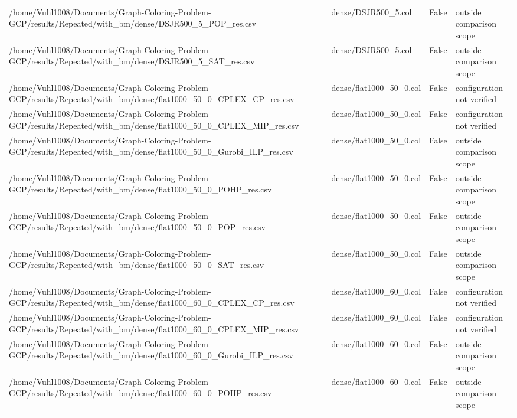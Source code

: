 \begin{table}[htbp]
\begin{tabular}{llll}
/home/Vuhl1008/Documents/Graph-Coloring-Problem-GCP/results/Repeated/with\_bm/dense/DSJR500\_5\_POP\_res.csv & dense/DSJR500\_5.col & False & outside comparison scope \\
/home/Vuhl1008/Documents/Graph-Coloring-Problem-GCP/results/Repeated/with\_bm/dense/DSJR500\_5\_SAT\_res.csv & dense/DSJR500\_5.col & False & outside comparison scope \\
/home/Vuhl1008/Documents/Graph-Coloring-Problem-GCP/results/Repeated/with\_bm/dense/flat1000\_50\_0\_CPLEX\_CP\_res.csv & dense/flat1000\_50\_0.col & False & configuration not verified \\
/home/Vuhl1008/Documents/Graph-Coloring-Problem-GCP/results/Repeated/with\_bm/dense/flat1000\_50\_0\_CPLEX\_MIP\_res.csv & dense/flat1000\_50\_0.col & False & configuration not verified \\
/home/Vuhl1008/Documents/Graph-Coloring-Problem-GCP/results/Repeated/with\_bm/dense/flat1000\_50\_0\_Gurobi\_ILP\_res.csv & dense/flat1000\_50\_0.col & False & outside comparison scope \\
/home/Vuhl1008/Documents/Graph-Coloring-Problem-GCP/results/Repeated/with\_bm/dense/flat1000\_50\_0\_POHP\_res.csv & dense/flat1000\_50\_0.col & False & outside comparison scope \\
/home/Vuhl1008/Documents/Graph-Coloring-Problem-GCP/results/Repeated/with\_bm/dense/flat1000\_50\_0\_POP\_res.csv & dense/flat1000\_50\_0.col & False & outside comparison scope \\
/home/Vuhl1008/Documents/Graph-Coloring-Problem-GCP/results/Repeated/with\_bm/dense/flat1000\_50\_0\_SAT\_res.csv & dense/flat1000\_50\_0.col & False & outside comparison scope \\
/home/Vuhl1008/Documents/Graph-Coloring-Problem-GCP/results/Repeated/with\_bm/dense/flat1000\_60\_0\_CPLEX\_CP\_res.csv & dense/flat1000\_60\_0.col & False & configuration not verified \\
/home/Vuhl1008/Documents/Graph-Coloring-Problem-GCP/results/Repeated/with\_bm/dense/flat1000\_60\_0\_CPLEX\_MIP\_res.csv & dense/flat1000\_60\_0.col & False & configuration not verified \\
/home/Vuhl1008/Documents/Graph-Coloring-Problem-GCP/results/Repeated/with\_bm/dense/flat1000\_60\_0\_Gurobi\_ILP\_res.csv & dense/flat1000\_60\_0.col & False & outside comparison scope \\
/home/Vuhl1008/Documents/Graph-Coloring-Problem-GCP/results/Repeated/with\_bm/dense/flat1000\_60\_0\_POHP\_res.csv & dense/flat1000\_60\_0.col & False & outside comparison scope \\

\end{tabular}
\end{table}
